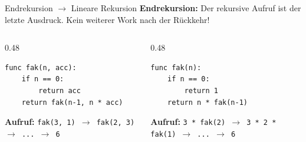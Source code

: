 \documentclass[aspectratio=169,11pt]{beamer}
\begin{document}
\begin{frame}[fragile]{Endrekursion $\rightarrow$ Lineare Rekursion}
    \textbf{Endrekursion:} Der rekursive Aufruf ist der letzte Ausdruck. Kein weiterer Work nach der Rückkehr!
    
    \begin{columns}[T]
        \begin{column}{0.48\textwidth}
            \begin{tcolorbox}[modernbox, title=Endrekursiv (mit Akkumulator)]
\begin{lstlisting}
func fak(n, acc):
    if n == 0:
        return acc
    return fak(n-1, n * acc)
\end{lstlisting}
            \end{tcolorbox}
            \small \textbf{Aufruf:} \texttt{fak(3, 1) $\rightarrow$ fak(2, 3) $\rightarrow$ ... $\rightarrow$ 6}
        \end{column}
        \begin{column}{0.48\textwidth}
            \begin{tcolorbox}[successbox, title=Linear Rekursiv]
\begin{lstlisting}
func fak(n):
    if n == 0:
        return 1
    return n * fak(n-1)
\end{lstlisting}
            \end{tcolorbox}
            \small \textbf{Aufruf:} \texttt{3 * fak(2) $\rightarrow$ 3 * 2 * fak(1) $\rightarrow$ ... $\rightarrow$ 6}
        \end{column}
    \end{columns}
\end{frame}
\end{document}
